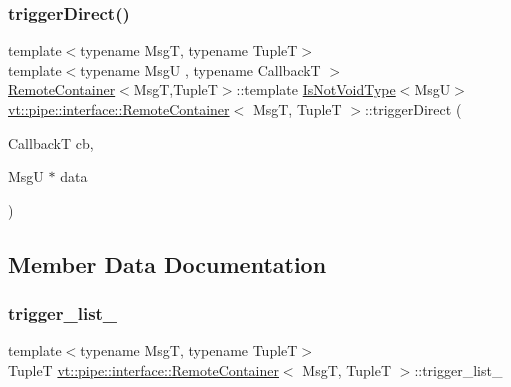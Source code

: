 \mbox{\label{structvt_1_1pipe_1_1interface_1_1_remote_container_a50eb531253f7ef5a31fcf43861c4b39a}} 
\subsubsection{\texorpdfstring{trigger\+Direct()}{triggerDirect()}\hspace{0.1cm}{\footnotesize\ttfamily [5/5]}}
{\footnotesize\ttfamily template$<$typename MsgT, typename TupleT$>$ \\
template$<$typename MsgU , typename CallbackT $>$ \\
\hyperlink{structvt_1_1pipe_1_1interface_1_1_remote_container}{Remote\+Container}$<$MsgT,TupleT$>$\+::template \hyperlink{structvt_1_1pipe_1_1interface_1_1_remote_container_a1dc69f6cfa1318c856a412940e3dbb50}{Is\+Not\+Void\+Type}$<$MsgU$>$ \hyperlink{structvt_1_1pipe_1_1interface_1_1_remote_container}{vt\+::pipe\+::interface\+::\+Remote\+Container}$<$ MsgT, TupleT $>$\+::trigger\+Direct (\begin{DoxyParamCaption}\item[{CallbackT}]{cb,  }\item[{MsgU $\ast$}]{data }\end{DoxyParamCaption})}



\subsection{Member Data Documentation}
\mbox{\label{structvt_1_1pipe_1_1interface_1_1_remote_container_a37a4c4a4fcd3a7daa27f697f01f3ac81}} 
\subsubsection{\texorpdfstring{trigger\+\_\+list\+\_\+}{trigger\_list\_}}
{\footnotesize\ttfamily template$<$typename MsgT, typename TupleT$>$ \\
TupleT \hyperlink{structvt_1_1pipe_1_1interface_1_1_remote_container}{vt\+::pipe\+::interface\+::\+Remote\+Container}$<$ MsgT, TupleT $>$\+::trigger\+\_\+list\+\_\+\hspace{0.3cm}{\ttfamily [private]}}



